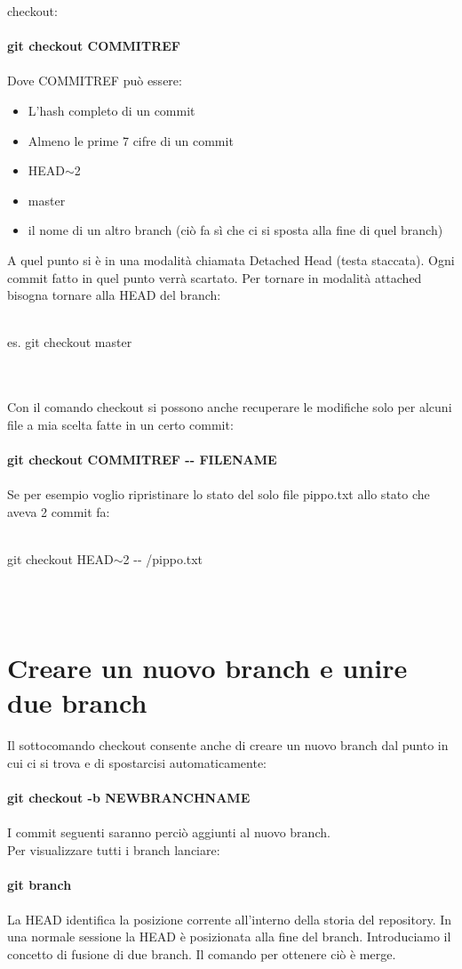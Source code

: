 \documentclass[a4paper,12pt]{report}
\begin{document}
checkout:
\\\\
\textbf{git checkout COMMITREF}
\\\\
Dove COMMITREF può essere:
\begin{itemize}
\item L'hash completo di un commit
\item Almeno le prime 7 cifre di un commit
\item HEAD$\sim$2
\item master
\item il nome di un altro branch (ciò fa sì che ci si sposta alla fine di quel branch)
\end{itemize}
A quel punto si è in una modalità chiamata Detached Head (testa staccata). Ogni commit fatto in quel punto verrà scartato. Per tornare in modalità attached bisogna tornare alla HEAD del branch:
\\\\
\centerline{es. git checkout master}
\\\\
Con il comando checkout si possono anche recuperare le modifiche solo per alcuni file a mia scelta fatte in un certo commit:
\\\\
\textbf{git checkout COMMITREF -{}- FILENAME}
\\\\
Se per esempio voglio ripristinare lo stato del solo file pippo.txt allo stato che aveva 2 commit fa:
\\\\
\centerline{git checkout HEAD$\sim$2 -{}- /pippo.txt}
\\\\
\chapter{Creare un nuovo branch e unire due branch}
Il sottocomando checkout consente anche di creare un nuovo branch dal punto in cui ci si trova e di spostarcisi automaticamente:
\\\\
\textbf{git checkout -b NEWBRANCHNAME}
\\\\
I commit seguenti saranno perciò aggiunti al nuovo branch.
\\
Per visualizzare tutti i branch lanciare:
\\\\
\textbf{git branch}
\\\\
La HEAD identifica la posizione corrente all'interno della storia del repository. In una normale sessione la HEAD è posizionata alla fine del branch.
Introduciamo il concetto di fusione di due branch. Il comando per ottenere ciò è merge.
\end{document}
